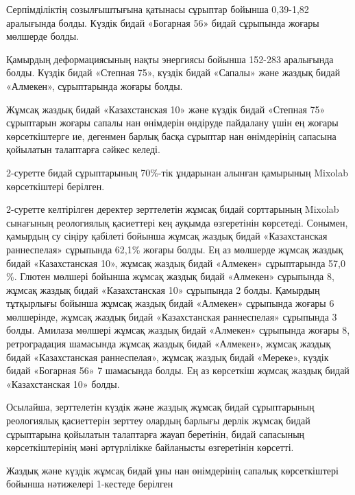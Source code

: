 \begin{multicols}{2}
Серпімділіктің созылғыштығына қатынасы сұрыптар бойынша 0,39-1,82
аралығында болды. Күздік бидай «Богарная 56» бидай сұрыпында жоғары
мөлшерде болды.

Қамырдың деформациясының нақты энергиясы бойынша 152-283 аралығында
болды. Күздік бидай «Степная 75», күздік бидай «Сапалы» және жаздық
бидай «Алмекен», сұрыптарында жоғары болды.

Жұмсақ жаздық бидай «Казахстанская 10» және күздік бидай «Степная 75»
сұрыптарын жоғары сапалы нан өнімдерін өндіруде пайдалану үшін ең жоғары
көрсеткіштерге ие, дегенмен барлық басқа сұрыптар нан өнімдерінің
сапасына қойылатын талаптарға сәйкес келеді.

2-суретте бидай сұрыптарының 70\%-тік ұндарынан алынған қамырының
Mixolab көрсеткіштері берілген.

2-суретте келтірілген деректер зерттелетін жұмсақ бидай сорттарының
Mixolab сынағының реологиялық қасиеттері кең ауқымда өзгеретінін
көрсетеді. Сонымен, қамырдың су сіңіру қабілеті бойынша жұмсақ жаздық
бидай «Казахстанская раннеспелая» сұрыпында 62,1\% жоғары болды. Ең аз
мөлшерде жұмсақ жаздық бидай «Казахстанская 10», жұмсақ жаздық бидай
«Алмекен» сұрыптарында 57,0 \%. Глютен мөлшері бойынша жұмсақ жаздық
бидай «Алмекен» сұрыпында 8, жұмсақ жаздық бидай «Казахстанская 10»
сұрыпында 2 болды. Қамырдың тұтқырлығы бойынша жұмсақ жаздық бидай
«Алмекен» сұрыпында жоғары 6 мөлшерінде, жұмсақ жаздық бидай
«Казахстанская раннеспелая» сұрыпында 3 болды. Амилаза мөлшері жұмсақ
жаздық бидай «Алмекен» сұрыпында жоғары 8, ретроградация шамасында
жұмсақ жаздық бидай «Алмекен», жұмсақ жаздық бидай «Казахстанская
раннеспелая», жұмсақ жаздық бидай «Мереке», күздік бидай «Богарная 56» 7
шамасында болды. Ең аз көрсеткіш жұмсақ жаздық бидай «Казахстанская 10»
болды.

Осылайша, зерттелетін күздік және жаздық жұмсақ бидай сұрыптарының
реологиялық қасиеттерін зерттеу олардың барлығы дерлік жұмсақ бидай
сұрыптарына қойылатын талаптарға жауап беретінін, бидай сапасының
көрсеткіштерінің мәні әртүрлілікке байланысты өзгеретінін көрсетті.

Жаздық және күздік жұмсақ бидай ұны нан өнімдерінің сапалық
көрсеткіштері бойынша нәтижелері 1-кестеде берілген
\end{multicols}

